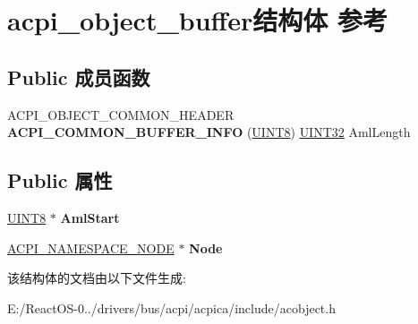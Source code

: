 \hypertarget{structacpi__object__buffer}{}\section{acpi\+\_\+object\+\_\+buffer结构体 参考}
\label{structacpi__object__buffer}
\subsection*{Public 成员函数}
\begin{DoxyCompactItemize}
\item 
\mbox{\label{structacpi__object__buffer_aafa93feeed07c9cde2bd8a9d16c6733e}} 
A\+C\+P\+I\+\_\+\+O\+B\+J\+E\+C\+T\+\_\+\+C\+O\+M\+M\+O\+N\+\_\+\+H\+E\+A\+D\+ER {\bfseries A\+C\+P\+I\+\_\+\+C\+O\+M\+M\+O\+N\+\_\+\+B\+U\+F\+F\+E\+R\+\_\+\+I\+N\+FO} (\hyperlink{_processor_bind_8h_ab27e9918b538ce9d8ca692479b375b6a}{U\+I\+N\+T8}) \hyperlink{_processor_bind_8h_ae1e6edbbc26d6fbc71a90190d0266018}{U\+I\+N\+T32} Aml\+Length
\end{DoxyCompactItemize}
\subsection*{Public 属性}
\begin{DoxyCompactItemize}
\item 
\mbox{\label{structacpi__object__buffer_ac2b42d2a414098e432cffb45525bf5c6}} 
\hyperlink{_processor_bind_8h_ab27e9918b538ce9d8ca692479b375b6a}{U\+I\+N\+T8} $\ast$ {\bfseries Aml\+Start}
\item 
\mbox{\label{structacpi__object__buffer_aeef75e1074d1103f85aa897b08e50476}} 
\hyperlink{structacpi__namespace__node}{A\+C\+P\+I\+\_\+\+N\+A\+M\+E\+S\+P\+A\+C\+E\+\_\+\+N\+O\+DE} $\ast$ {\bfseries Node}
\end{DoxyCompactItemize}


该结构体的文档由以下文件生成\+:\begin{DoxyCompactItemize}
\item 
E\+:/\+React\+O\+S-\/0../drivers/bus/acpi/acpica/include/acobject.\+h\end{DoxyCompactItemize}
